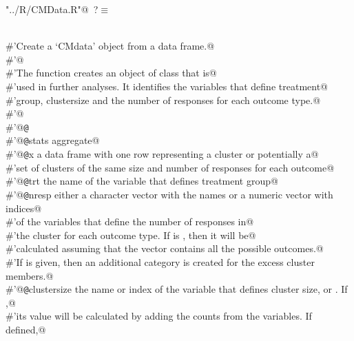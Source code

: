 \documentclass[reqno]{amsart}
\renewcommand{\NWtarget}[2]{\hypertarget{#1}{#2}}
\begin{document}
\begin{flushleft} \small\label{scrap1}\raggedright\small
\NWtarget{nuweb?}{} \verb@"../R/CMData.R"@\nobreak\ {\footnotesize {?}}$\equiv$
\vspace{-1ex}
\begin{list}{}{} \item
\mbox{}\verb@@\\
\mbox{}\verb@#'Create a `CMdata' object from a data frame.@\\
\mbox{}\verb@#'@\\
\mbox{}\verb@#'The  function creates an object of class  that is@\\
\mbox{}\verb@#'used in further analyses. It identifies the variables that define treatment@\\
\mbox{}\verb@#'group, clustersize and the number of responses for each outcome type.@\\
\mbox{}\verb@#'@\\
\mbox{}\verb@#'@{\tt @}\verb@export@\\
\mbox{}\verb@#'@{\tt @}\verb@importFrom stats aggregate@\\
\mbox{}\verb@#'@{\tt @}\verb@param x a data frame with one row representing a cluster or potentially a@\\
\mbox{}\verb@#'set of clusters of the same size and number of responses for each outcome@\\
\mbox{}\verb@#'@{\tt @}\verb@param trt the name of the variable that defines treatment group@\\
\mbox{}\verb@#'@{\tt @}\verb@param nresp either a character vector with the names or a numeric vector with indices@\\
\mbox{}\verb@#'of the variables that define the number of responses in@\\
\mbox{}\verb@#'the cluster for each outcome type. If  is , then it will be@\\
\mbox{}\verb@#'calculated assuming that the  vector contains all the possible outcomes.@\\
\mbox{}\verb@#'If  is given, then an additional category is created for the excess cluster members.@\\
\mbox{}\verb@#'@{\tt @}\verb@param clustersize the name or index of the variable that defines cluster size, or . If ,@\\
\mbox{}\verb@#'its value will be calculated by adding the counts from the  variables. If defined,@\\

\end{list}
\end{flushleft}
\end{document}
